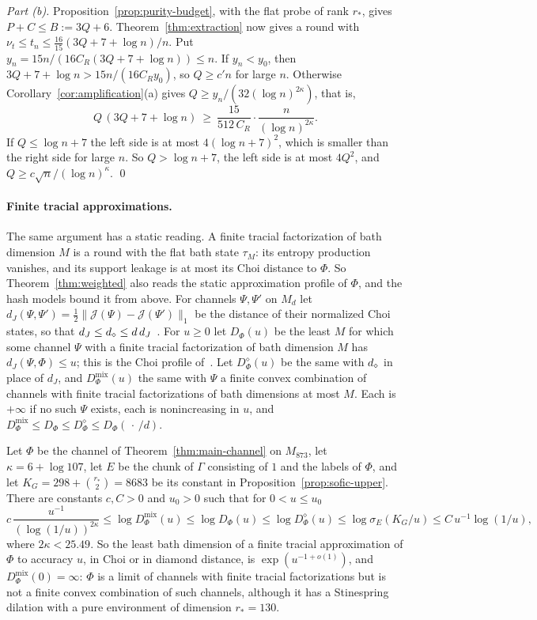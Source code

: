 \emph{Part (b).} Proposition~\ref{prop:purity-budget}, with the flat probe of rank $r_*$, gives $P+C\le B:=3Q+6$. Theorem~\ref{thm:extraction} now
gives a round with $\nu_t\le t_n\le\frac{16}{15}(3Q+7+\log n)/n$. Put $y_n=15n/(16C_R(3Q+7+\log n))\le n$. If $y_n<y_0$, then
$3Q+7+\log n>15n/(16C_Ry_0)$, so $Q\ge c'n$ for large $n$. Otherwise Corollary~\ref{cor:amplification}(a) gives $Q\ge y_n/(32(\log n)^{2\kappa})$,
that is,
\[
Q\,(3Q+7+\log n)\ \ge\ \frac{15}{512\,C_R}\cdot\frac{n}{(\log n)^{2\kappa}} .
\]
If $Q\le\log n+7$ the left side is at most $4(\log n+7)^2$, which is smaller than the right side for large $n$. So $Q>\log n+7$, the left side is
at most $4Q^2$, and $Q\ge c\sqrt n/(\log n)^\kappa$. \qed

\paragraph{Finite tracial approximations.} The same argument has a static reading. A finite tracial factorization of bath dimension $M$ is a
round with the flat bath state $\tau_M$: its entropy production vanishes, and its support leakage is at most its Choi distance to $\Phi$. So
Theorem~\ref{thm:weighted} also reads the static approximation profile of $\Phi$, and the hash models bound it from above. For channels
$\Psi,\Psi'$ on $M_d$ let $d_J(\Psi,\Psi')=\frac12\|\mathcal J(\Psi)-\mathcal J(\Psi')\|_1$ be the distance of their normalized Choi states, so
that $d_J\le d_\diamond\le d\,d_J$~\cite[Section~2]{DouglasMghirbiB}. For $u\ge0$ let $D_\Phi(u)$ be the least $M$ for which some channel $\Psi$ with a
finite tracial factorization of bath dimension $M$ has $d_J(\Psi,\Phi)\le u$; this is the Choi profile
of~\cite[Definition~2.1]{DouglasMghirbiB}. Let $D^\diamond_\Phi(u)$ be the same with $d_\diamond$ in place of $d_J$, and $D^{\mathrm{mix}}_\Phi(u)$
the same with $\Psi$ a finite convex combination of channels with finite tracial factorizations of bath dimensions at most $M$. Each is
$+\infty$ if no such $\Psi$ exists, each is nonincreasing in $u$, and $D^{\mathrm{mix}}_\Phi\le D_\Phi\le D^\diamond_\Phi\le D_\Phi(\,\cdot\,/d)$.

\begin{corollary}\label{cor:profile}
Let $\Phi$ be the channel of Theorem~\ref{thm:main-channel} on $M_{873}$, let $\kappa=6+\log107$, let $E$ be the chunk of $\Gamma$
consisting of $1$ and the labels of $\Phi$, and let $K_G=298+\binom{r_*}2=8683$ be its constant in Proposition~\ref{prop:sofic-upper}.
There are constants $c,C>0$ and $u_0>0$ such that for $0<u\le u_0$
\[
c\,\frac{u^{-1}}{(\log(1/u))^{2\kappa}}\le\log D^{\mathrm{mix}}_\Phi(u)\le\log D_\Phi(u)\le\log D^\diamond_\Phi(u)\le\log\sigma_E(K_G/u)\le C\,u^{-1}\log(1/u),
\]
where $2\kappa<25.49$. So the least bath dimension of a finite tracial approximation of $\Phi$ to accuracy $u$, in Choi or in diamond
distance, is $\exp(u^{-1+o(1)})$, and $D^{\mathrm{mix}}_\Phi(0)=\infty$: $\Phi$ is a limit of channels with finite tracial factorizations
but is not a finite convex combination of such channels, although it has a Stinespring dilation with a pure environment of dimension
$r_*=130$.
\end{corollary}

